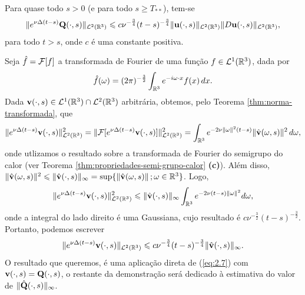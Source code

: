\begin{pbox} \label{pr:nsei}
    Para quase todo $s > 0$ (e para todo $s \geqslant T_{**}$), tem-se
    \[
        \Vert e^{\nu\Delta(t-s)}\mathbf{Q}(\cdot,s) \Vert_{\mathcal{L}^2(\mathbb{R}^3)} \leqslant c \nu^{-\frac{3}{4}} (t-s)^{-\frac{3}{4}} \Vert \mathbf{u}(\cdot,s) \Vert_{\mathcal{L}^2(\mathbb{R}^3)} \Vert D\mathbf{u}(\cdot,s) \Vert_{\mathcal{L}^2(\mathbb{R}^3)},
    \]
    para todo $t > s$, onde $c$ é uma constante positiva.
\end{pbox}
\begin{prf}
    Seja $\hat f = \mathcal{F}[f]$ a transformada de Fourier de uma função $f \in \mathcal{L}^1(\mathbb{R}^3)$, dada por
    \[
        \hat f (\omega) = (2\pi)^{-\frac{3}{2}} \int_{\mathbb{R}^3} e^{-i\omega \cdot x} f(x) \, dx.
    \]
    Dada $\mathbf{v}(\cdot,s) \in \mathcal{L}^1 (\mathbb{R}^3) \cap \mathcal{L}^2(\mathbb{R}^3)$ arbitrária, obtemos, pelo Teorema \ref{thm:norma-transformada}, que
    \[
        \Vert e^{\nu\Delta(t-s)} \mathbf{v}(\cdot,s) \Vert_{\mathcal{L}^2(\mathbb{R}^3)}^2 = \Vert \mathcal{F} [e^{\nu\Delta(t-s)} \mathbf{v}(\cdot,s)] \Vert_{\mathcal{L}^2(\mathbb{R}^3)}^2 = \int_{\mathbb{R}^3} e^{-2\nu \Vert \omega \Vert^2 (t-s)}\Vert \hat{\mathbf{v}}(\omega,s) \Vert^2 \,d\omega,
    \]
    onde utlizamos o resultado sobre a transformada de Fourier do semigrupo do calor (ver Teorema \ref{thm:propriedades-semi-grupo-calor} \textbf{(c)}). Além disso, $\Vert \hat {\mathbf{v}}(\omega,s) \Vert^2 \leqslant \Vert \hat{\mathbf{v}}(\cdot,s) \Vert_\infty = \sup\{ \Vert \hat{\mathbf{v}}(\omega,s) \Vert \,; \omega \in \mathbb{R}^3 \}$. Logo,
    \[
        \Vert e^{\nu\Delta(t-s)} \mathbf{v}(\cdot,s) \Vert_{\mathcal{L}^2(\mathbb{R}^3)}^2 \leqslant \Vert \hat{\mathbf{v}}(\cdot,s) \Vert_\infty \int_{\mathbb{R}^3} e^{-2\nu (t-s) \Vert \omega \Vert^2} d\omega,
    \]
    onde a integral do lado direito é uma Gaussiana, cujo resultado é $c \nu^{-\frac{3}{2}} (t - s)^{-\frac{3}{2}}$. Portanto, podemos escrever
    \begin{equation} \label{eq:2.7}
        \Vert e^{\nu\Delta(t-s)} \mathbf{v}(\cdot,s) \Vert_{\mathcal{L}^2(\mathbb{R}^3)}\leqslant c \nu^{-\frac{3}{4}} (t-s)^{-\frac{3}{4}} \Vert \hat{\mathbf{v}}(\cdot,s) \Vert_\infty.
    \end{equation}
    O resultado que queremos, é uma aplicação direta de (\ref{eq:2.7}) com $\mathbf{v}(\cdot,s) = \mathbf{Q}(\cdot,s)$, o restante da demonstração será dedicado à estimativa do valor de $\Vert \hat{\mathbf{Q}}(\cdot,s) \Vert_\infty$. 
    

\end{prf}
